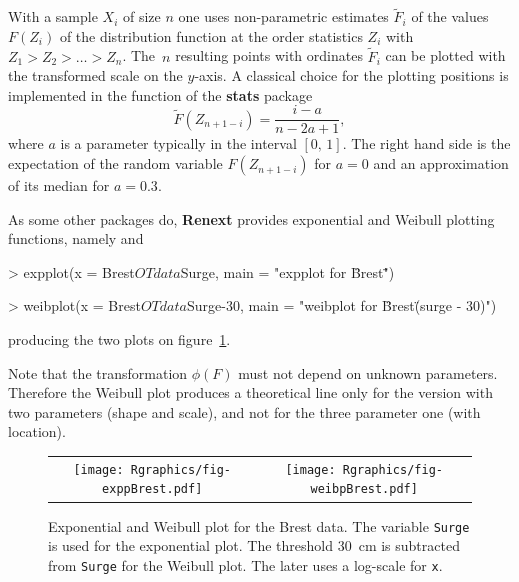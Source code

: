 \documentclass[a4paper]{report}
\newcommand{\pkg}[1]{\textbf{#1}}
\begin{document}
With a sample $X_i$ of size $n$ one uses non-parametric estimates
$\widetilde{F}_i$ of the values $F(Z_{i})$ of the distribution
function at the order statistics $Z_{i}$ with $Z_1> Z_2 > \dots >
Z_n$. The~$n$ resulting points with ordinates $\widetilde{F}_{i}$ can
be plotted with the transformed scale on the $y$-axis. A classical
choice for the plotting positions is implemented in the \verb@ppoints@
function of the \pkg{stats} package %
\begin{equation}
  \label{eq:CUNNAME}
  \widetilde{F}(Z_{n+1-i}) = \frac{i-a}{n -2a + 1},
\end{equation}
where $a$ is a parameter typically in the interval $[0,\,1]$.  The
right hand side is the expectation of the random variable
$F(Z_{n+1-i})$ for $a=0$ and an approximation of its median for
$a=0.3$. 

As some other packages do, \textbf{Renext} provides exponential and
Weibull plotting functions, namely \verb@expplot@ and \verb@weibplot@

\begin{Schunk}
\begin{Sinput}
> expplot(x = Brest$OTdata$Surge, main = "expplot for \"Brest\"")
\end{Sinput}
\end{Schunk}
\vspace{-13pt}
\begin{Schunk}
\begin{Sinput}
> weibplot(x = Brest$OTdata$Surge-30, main = "weibplot for \"Brest\" (surge - 30)")
\end{Sinput}
\end{Schunk}

\noindent
producing the two plots on figure~\ref{FUNG}.

Note that the transformation $\phi(F)$ must not depend on unknown
parameters. Therefore the Weibull plot produces a theoretical line
only for the version with two parameters (shape and scale), and not
for the three parameter one (with location).
\begin{figure}
   \centering
   \begin{tabular}{c c} 
     \texttt{[image: Rgraphics/fig-exppBrest.pdf]} &
     \texttt{[image: Rgraphics/fig-weibpBrest.pdf]} 
   \end{tabular}
   \caption{\label{FUNG} Exponential and Weibull plot for the Brest
     data. The variable \texttt{Surge} is used for the exponential
     plot. The threshold $30$~cm is subtracted from \texttt{Surge} for
     the Weibull plot. The later uses a log-scale for \texttt{x}.  }
\end{figure}
\end{document}

